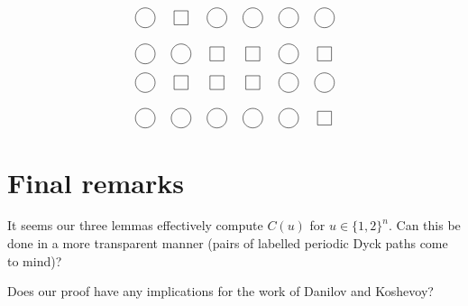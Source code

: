 \documentclass[reqno]{amsart}
\newcommand{\0}{\phantom{c}}
\theoremstyle{plain}
\theoremstyle{definition}
\numberwithin{equation}{section}
\begin{document}
\begin{figure}
\label{fi:proof_example}

\[
\begin{tikzpicture}
  \node[circle, draw=black] at (0, 3){\0};
  \node[rectangle, draw=black] at (1, 3){\0};
  \node[circle, draw=black] at (2, 3){\0};
  \node[circle, draw=black] at (3, 3){\0};
  \node[circle, draw=black] at (4, 3){\0};
  \node[circle, draw=black] at (5, 3){\0};
  \node[circle, draw=black] at (0, 2){\0};
  \node[circle, draw=black] at (1, 2){\0};
  \node[rectangle, draw=black] at (2, 2){\0};
  \node[rectangle, draw=black] at (3, 2){\0};
  \node[circle, draw=black] at (4, 2){\0};
  \node[rectangle, draw=black] at (5, 2){\0};
\end{tikzpicture}
\]
\vspace{2em}
\[
\begin{tikzpicture}
  \node[circle, draw=black] at (0, 3){\0};
  \node[rectangle, draw=black] at (1, 3){\0};
  \node[rectangle, draw=black] at (2, 3){\0};
  \node[rectangle, draw=black] at (3, 3){\0};
  \node[circle, draw=black] at (4, 3){\0};
  \node[circle, draw=black] at (5, 3){\0};
  \node[circle, draw=black] at (0, 2){\0};
  \node[circle, draw=black] at (1, 2){\0};
  \node[circle, draw=black] at (2, 2){\0};
  \node[circle, draw=black] at (3, 2){\0};
  \node[circle, draw=black] at (4, 2){\0};
  \node[rectangle, draw=black] at (5, 2){\0};
\end{tikzpicture}
\]
\end{figure}




\section{Final remarks}

It seems our three lemmas effectively compute $C(u)$ for $u \in \{1,2\}^n$. Can this be done in a more transparent manner (pairs of labelled periodic Dyck paths come to mind)?

Does our proof have any implications for the work of Danilov and Koshevoy?

\vspace{10cm} 
\end{document}
